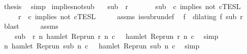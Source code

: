 \begin{isabellebody}
\ {\isacharquery}thesis\ \isamarkupfalse%
\ simp\isanewline
{}\isamarkupfalse%
%
\endisatagproof
{\isafoldproof}%
%
\isadelimproof
\isanewline
%
\endisadelimproof
\isanewline
{}\isamarkupfalse%
\ implies{\isacharunderscore}not{\isacharunderscore}sub{\isacharcolon}\isanewline
\ \ \ {\isacartoucheopen}sub\ {\isasymlless}\ r{\isacartoucheclose}\isanewline
\ \ \ \ \ \ \ {\isacartoucheopen}sub\ {\isasymin}\ {\isasymlbrakk}c\ implies\ not\ c\isactrlsub T\isactrlsub E\isactrlsub S\isactrlsub L{\isacartoucheclose}\isanewline
\ \ \ \ \ {\isacartoucheopen}r\ {\isasymin}\ {\isasymlbrakk}c\ implies\ not\ c\isactrlsub T\isactrlsub E\isactrlsub S\isactrlsub L{\isacartoucheclose}\isanewline
%
\isadelimproof
%
\endisadelimproof
%
\isatagproof
{}\isamarkupfalse%
\ {\isacharminus}\isanewline
\ \ \isamarkupfalse%
\ assms{\isacharparenleft}{}{\isacharparenright}\ is{\isacharunderscore}subrun{\isacharunderscore}def\ \isamarkupfalse%
\ f\ \ {\isacartoucheopen}dilating\ f\ sub\ r{\isacartoucheclose}\ \isamarkupfalse%
\ blast\isanewline
\ \ \isamarkupfalse%
\ \isamarkupfalse%
\ assms{\isacharparenleft}{}{\isacharparenright}\ \isamarkupfalse%
\isanewline
\ \ \ \ {\isacartoucheopen}sub\ {\isasymin}\ {\isacharbraceleft}r{\isachardot}\ {\isasymforall}n{\isachardot}\ hamlet\ {\isacharparenleft}{\isacharparenleft}Rep{\isacharunderscore}run\ r{\isacharparenright}\ n\ c\ {\isasymlongrightarrow}\ {\isasymnot}\ hamlet\ {\isacharparenleft}{\isacharparenleft}Rep{\isacharunderscore}run\ r{\isacharparenright}\ n\ c\ \isamarkupfalse%
\ simp\isanewline
\ \ \isamarkupfalse%
\ {\isacartoucheopen}{\isasymforall}n{\isachardot}\ hamlet\ {\isacharparenleft}{\isacharparenleft}Rep{\isacharunderscore}run\ sub{\isacharparenright}\ n\ c\ {\isasymlongrightarrow}\ {\isasymnot}\ hamlet\ {\isacharparenleft}{\isacharparenleft}Rep{\isacharunderscore}run\ sub{\isacharparenright}\ n\ c\ \isamarkupfalse%
\ simp\isanewline
\ \ \isamarkupfalse%

\end{isabellebody}

